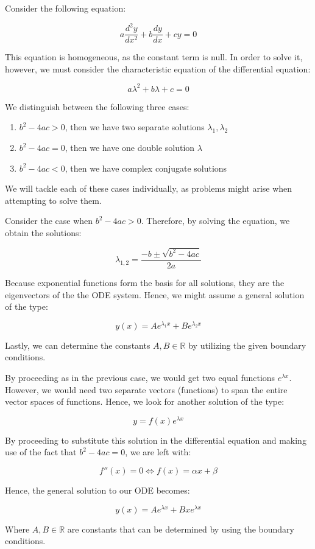 \documentclass[12pt]{article}
\begin{document}
Consider the following equation:

\[ a\frac{d^2y}{dx^2} + b\frac{dy}{dx} + cy = 0 \]

This equation is homogeneous, as the constant term is null. In order to solve it, however, we must consider the characteristic equation of the differential equation:

\[ a\lambda^2 + b\lambda + c = 0 \]

We distinguish between the following three cases:

\begin{enumerate}
    \item $b^2 - 4ac > 0$, then we have two separate solutions $\lambda_1, \lambda_2$
    \item $b^2 - 4ac = 0$, then we have one double solution $\lambda$
    \item $b^2 - 4ac < 0$, then we have complex conjugate solutions
\end{enumerate}

We will tackle each of these cases individually, as problems might arise when attempting to solve them.

\begin{proposition}
    Consider the case when $b^2 - 4ac > 0$. Therefore, by solving the equation, we obtain the solutions:

    \[ \lambda_{1, 2} = \frac{-b \pm \sqrt{b^2 - 4ac}}{2a} \]

    Because exponential functions form the basis for all solutions, they are the eigenvectors of the the ODE system. Hence, we might assume a general solution of the type:

    \[ y(x) = Ae^{\lambda_1x} + Be^{\lambda_2x} \]

    Lastly, we can determine the constants $A, B \in \mathbb{R}$ by utilizing the given boundary conditions.
\end{proposition}

\begin{proposition}
    By proceeding as in the previous case, we would get two equal functions $e^{\lambda x}$. However, we would need two separate vectors (functions) to span the entire vector spaces of functions. Hence, we look for another solution of the type:

    \[ y = f(x)e^{\lambda x} \]

    By proceeding to substitute this solution in the differential equation and making use of the fact that $b^2 - 4ac = 0$, we are left with:

    \[ f''(x) = 0 \Leftrightarrow f(x) = \alpha x + \beta \]

    Hence, the general solution to our ODE becomes:

    \[ y(x) = Ae^{\lambda x} + Bxe^{\lambda x} \]

    Where $A, B \in \mathbb{R}$ are constants that can be determined by using the boundary conditions.
\end{proposition}
\end{document}
